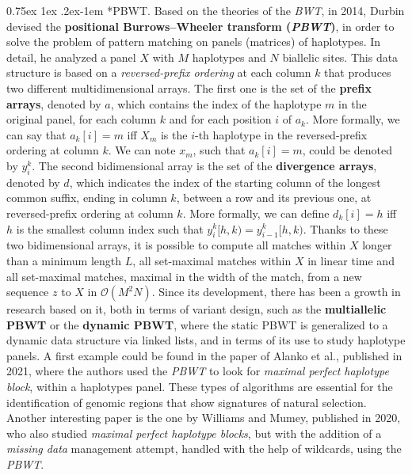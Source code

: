 \documentclass[a4paper,11pt, oneside]{article}
\makeatletter
\renewcommand{\paragraph}{%
  \@startsection{paragraph}{4}%
  {\z@}{0.75ex \@plus 1ex \@minus .2ex}{-1em}%
  {\normalfont\normalsize\bfseries}%
}
\makeatother
\begin{document}
\paragraph*{PBWT.}
Based on the theories of the \textit{BWT}, in 2014, Durbin devised the
\textbf{positional Burrows–Wheeler transform (\textit{PBWT})}, in order to
solve the problem of pattern matching on panels (matrices) of haplotypes. In
detail, he analyzed a panel $X$ with $M$ haplotypes and $N$ biallelic
sites. This data structure is based on a \textit{reversed-prefix ordering} at
each column $k$ that produces two different multidimensional arrays. The first
one is the set of the \textbf{prefix arrays}, denoted by $a$, which contains the
index of the haplotype $m$ in the original panel, for each column $k$ and for  
each position $i$ of $a_k$. More formally, we can say that $a_k[i]=m$ iff $X_m$
is the $i$-th haplotype in the reversed-prefix ordering at column $k$. We can
note $x_m$, such that $a_k[i]=m$, could be denoted by $y_i^k$. The second
bidimensional array is the set of the \textbf{divergence arrays}, denoted by
$d$, which indicates the index of the starting column of the longest common
suffix, ending in column $k$, between a row and its previous one, at
reversed-prefix ordering at column $k$. More formally, we can define $d_k[i]=h$
iff $h$ is the smallest column index such that $y_i^k[h,k)=y_{i-1}^k[h,k)$. 
Thanks to these two bidimensional arrays, it is possible to compute all matches
within $X$ longer than a minimum length $L$, all set-maximal matches within $X$
in linear time and all set-maximal matches, maximal in the width of the match,
from a new sequence $z$ to $X$ in $\mathcal{O}(M^2N)$.
Since its development, there has been a growth in
research based on it, both in terms of variant design, such as the
\textbf{multiallelic PBWT} or the \textbf{dynamic PBWT}, where the static PBWT
is generalized to a dynamic data 
structure via linked lists, and in terms of its use to study haplotype panels.
A first example could be found in the paper of Alanko et al., published in
2021, where the authors used the \textit{PBWT} to look for \textit{maximal
  perfect haplotype block}, within a haplotypes panel. These types of
algorithms are essential for the identification of genomic regions that show
signatures of natural selection.
Another interesting paper is the one by Williams and Mumey, published in 2020,
who also studied \textit{maximal perfect haplotype blocks}, but with the
addition of a \textit{missing data} management attempt, handled with the help of
wildcards, using the \textit{PBWT}. 
\end{document}
